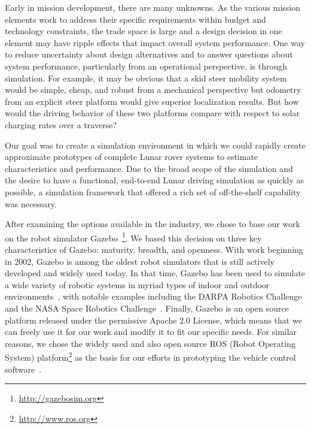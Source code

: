 \documentclass[twocolumn,letterpaper]{IEEEAerospaceCLS}  %
\begin{document}
Early in mission development, there are many unknowns. 
As the various mission elements work to address their specific requirements within budget and technology constraints, the trade space is large and a design decision in one element may have ripple effects that impact overall system performance. 
One way to reduce uncertainty about design alternatives and to answer questions about system performance, particularly from an operational perspective, is through simulation. 
For example, it may be obvious that a skid steer mobility system would be simple, cheap, and robust from a mechanical perspective but odometry from an explicit steer platform would give superior localization results. 
But how would the driving behavior of these two platforms compare with respect to solar charging rates over a traverse? 

Our goal was to create a simulation environment in which we could rapidly create approximate prototypes of complete Lunar rover systems to estimate characteristics and performance. 
Due to the broad scope of the simulation and the desire to have a functional, end-to-end Lunar driving simulation as quickly as possible, a simulation framework that offered a rich set of off-the-shelf capability was necessary. 

After examining the options available in the industry, we chose to base our work on the robot simulator Gazebo~\cite{koenig2004design}\footnote{\url{http://gazebosim.org}}.
We based this decision on three key characteristics of Gazebo: maturity, breadth, and openness.
With work beginning in 2002, Gazebo is among the oldest robot simulators that is still actively developed and widely used today.
In that time, Gazebo has been used to simulate a wide variety of robotic systems in myriad types of indoor and outdoor environments~\cite{paepcke2016gazebo}, with notable examples including the DARPA Robotics Challenge~\cite{aguero2015inside} and the NASA Space Robotics Challenge~\cite{hambuchen2017nasa}.
Finally, Gazebo is an open source platform released under the permissive Apache 2.0 License, which means that we can freely use it for our work and modify it to fit our specific needs.
For similar reasons, we chose the widely used and also open source ROS (Robot Operating System) platform\footnote{\url{http://www.ros.org}} as the basis for our efforts in prototyping the vehicle control software~\cite{quigley2009ros}.

\end{document}
